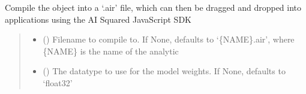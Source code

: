 \documentclass[letterpaper,10pt,english]{sphinxmanual}
\begin{document}
\begin{fulllineitems}

\begin{fulllineitems}
\label{\detokenize{aisquared.config:aisquared.config.ModelConfiguration.ModelConfiguration.compile}}
\pysigstartsignatures
{}
\pysigstopsignatures
\sphinxAtStartPar
Compile the object into a ‘.air’ file, which can then be dragged and
dropped into applications using the AI Squared JavaScript SDK
\begin{quote}\begin{description}
\begin{itemize}
\item {} 
\sphinxAtStartPar
{} (\sphinxstyleliteralemphasis{\sphinxupquote{ (}}\sphinxstyleliteralemphasis{\sphinxupquote{)}}) \textendash{} Filename to compile to. If None, defaults to ‘\{NAME\}.air’, where \{NAME\} is the
name of the analytic

\item {} 
\sphinxAtStartPar
{} (\sphinxstyleliteralemphasis{\sphinxupquote{ (}}\sphinxstyleliteralemphasis{\sphinxupquote{)}}) \textendash{} The datatype to use for the model weights. If None, defaults to ‘float32’

\end{itemize}

\end{description}\end{quote}


\end{fulllineitems}
\end{fulllineitems}
\end{document}
